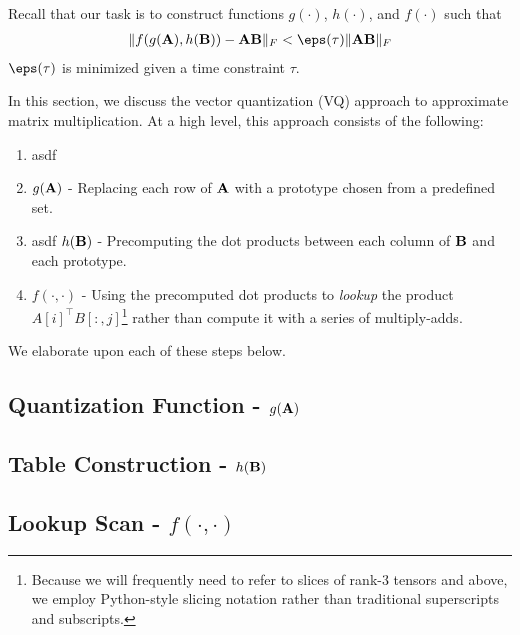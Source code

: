 
Recall that our task is to construct functions $g(\cdot)$, $h(\cdot)$, and $f(\cdot)$ such that
\begin{align}
    \norm{f(g(\A), h(\B)) - \A\B}_F < \eps(\tau) \norm{\A\B}_F
\end{align}
$\eps(\tau)$ is minimized given a time constraint $\tau$.

In this section, we discuss the vector quantization (VQ) approach to approximate matrix multiplication. %
At a high level, this approach consists of the following:
\begin{enumerate}
    \item asdf
    \item $g(\mathbf{A})$ - Replacing each row of $\mathbf{A}$ with a prototype chosen from a predefined set.
    \item asdf $h(\mathbf{B})$ - Precomputing the dot products between each column of $\mathbf{B}$ and each prototype.
    \item $f(\cdot,\cdot)$ - Using the precomputed dot products to \textit{lookup} the product $A[i]^\top B[:, j]$\footnote{Because we will frequently need to refer to slices of rank-3 tensors and above, we employ Python-style slicing notation rather than traditional superscripts and subscripts.} rather than compute it with a series of multiply-adds.
\end{enumerate}

We elaborate upon each of these steps below.

\subsection{Quantization Function - $g(\mathbf{A})$}

\subsection{Table Construction - $h(\mathbf{B})$}

\subsection{Lookup Scan - $f(\cdot,\cdot)$}


